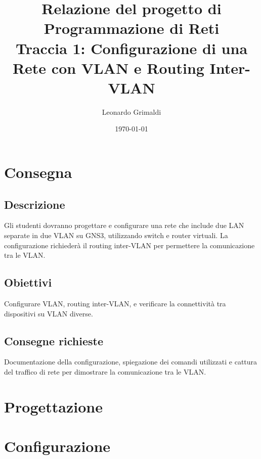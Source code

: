 \documentclass[a4paper,12pt]{report}
\title{Relazione del progetto di Programmazione di Reti 
    \\ Traccia 1: Configurazione di una Rete con VLAN e Routing Inter-VLAN}
\author{Leonardo Grimaldi}
\date{\today}
\begin{document}
\maketitle
\tableofcontents
\chapter{Consegna}
\section{Descrizione}
Gli studenti dovranno progettare e configurare una rete che include due LAN separate in due VLAN su GNS3, utilizzando switch e router virtuali. La configurazione richiederà il routing inter-VLAN per permettere la comunicazione tra le VLAN.
\section{Obiettivi}
Configurare VLAN, routing inter-VLAN, e verificare la connettività tra dispositivi su VLAN diverse.
\section{Consegne richieste}
Documentazione della configurazione, spiegazione dei comandi utilizzati e cattura del traffico di rete per dimostrare la comunicazione tra le VLAN.
\chapter{Progettazione}

\chapter{Configurazione}
\end{document}
